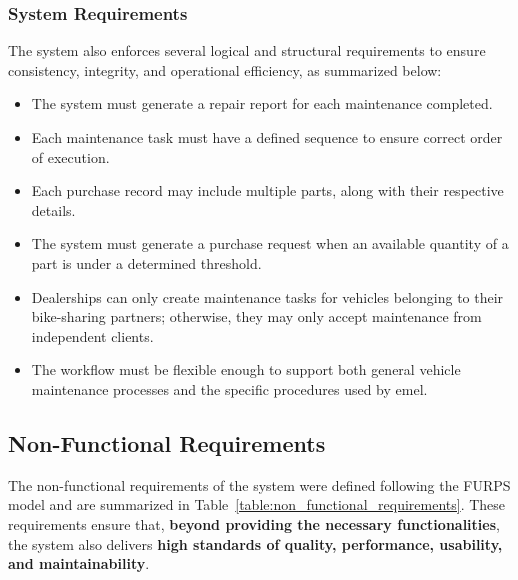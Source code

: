\subsubsection{System Requirements}

The system also enforces several logical and structural requirements to ensure consistency, integrity, and operational efficiency, as summarized below:

\begin{itemize}
    \item The system must generate a repair report for each maintenance completed.
    \item Each maintenance task must have a defined sequence to ensure correct order of execution.
    \item Each purchase record may include multiple parts, along with their respective details.
    \item The system must generate a purchase request when an available quantity of a part is under a determined threshold. 
    \item Dealerships can only create maintenance tasks for vehicles belonging to their bike-sharing partners; otherwise, they may only accept maintenance from independent clients.
    \item The workflow must be flexible enough to support both general vehicle maintenance processes and the specific procedures used by \ac{emel}.
\end{itemize}



\subsection{Non-Functional Requirements}

The non-functional requirements of the system were defined following the FURPS model and are summarized in Table~\ref{table:non_functional_requirements}. These requirements ensure that, \textbf{beyond providing the necessary functionalities}, the system also delivers \textbf{high standards of quality, performance, usability, and maintainability}.


